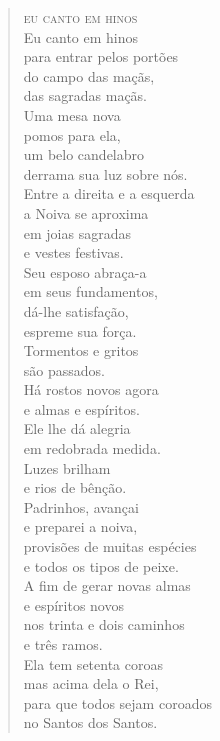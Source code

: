 \begin{verse}
\textsc{eu canto em hinos}\\[10pt]

Eu canto em hinos\\
para entrar pelos portões\\
do campo das maçãs,\\
das sagradas maçãs.\\[5pt]

Uma mesa nova\\
pomos para ela,\\
um belo candelabro\\
derrama sua luz sobre nós.\\[5pt]

Entre a direita e a esquerda\\
a Noiva se aproxima\\
em joias sagradas\\
e vestes festivas.\\[5pt]

Seu esposo abraça-a\\
em seus fundamentos,\\
dá-lhe satisfação,\\
espreme sua força.\\[5pt]

Tormentos e gritos\\
são passados.\\
Há rostos novos agora\\
e almas e espíritos.\\[5pt]

Ele lhe dá alegria\\
em redobrada medida.\\
Luzes brilham\\
e rios de bênção.\\[5pt]

Padrinhos, avançai\\
e preparei a noiva,\\
provisões de muitas espécies\\
e todos os tipos de peixe.\\[5pt]

A fim de gerar novas almas\\
e espíritos novos\\
nos trinta e dois caminhos\\
e três ramos.\\[5pt]

Ela tem setenta coroas\\
mas acima dela o Rei,\\
para que todos sejam coroados\\
no Santos dos Santos.\\[5pt]


\end{verse}
